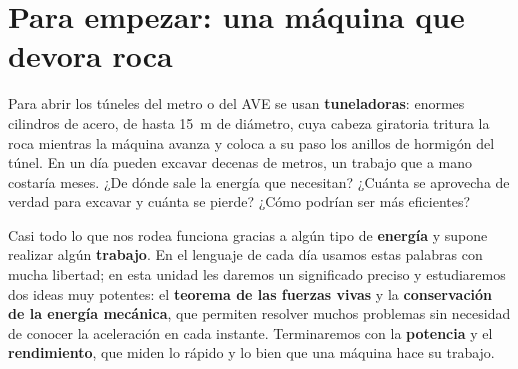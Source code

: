 
\section*{Para empezar: una máquina que devora roca}

Para abrir los túneles del metro o del AVE se usan \textbf{tuneladoras}: enormes cilindros de acero, de hasta \qty{15}{\m} de
diámetro, cuya cabeza giratoria tritura la roca mientras la máquina avanza y coloca a su paso los anillos de hormigón del túnel. En
un día pueden excavar decenas de metros, un trabajo que a mano costaría meses. ¿De dónde sale la energía que necesitan? ¿Cuánta se
aprovecha de verdad para excavar y cuánta se pierde? ¿Cómo podrían ser más eficientes?

Casi todo lo que nos rodea funciona gracias a algún tipo de \textbf{energía} y supone realizar algún \textbf{trabajo}. En el lenguaje
de cada día usamos estas palabras con mucha libertad; en esta unidad les daremos un significado preciso y estudiaremos dos ideas muy
potentes: el \textbf{teorema de las fuerzas vivas} y la \textbf{conservación de la energía mecánica}, que permiten resolver muchos
problemas sin necesidad de conocer la aceleración en cada instante. Terminaremos con la \textbf{potencia} y el \textbf{rendimiento},
que miden lo rápido y lo bien que una máquina hace su trabajo.

